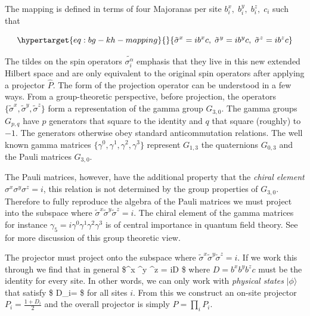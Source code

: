 The mapping is defined in terms of four Majoranas per site \(b_i^x,\;b_i^y,\;b_i^z,\;c_i\) such that

\begin{equation}\protect\hypertarget{eq:bg-kh-mapping}{}{\tilde{\sigma}^x = i b^x c,\; \tilde{\sigma}^y = i b^y c,\; \tilde{\sigma}^z = i b^z c}\label{eq:bg-kh-mapping}\end{equation}

The tildes on the spin operators \(\tilde{\sigma_i^\alpha}\) emphasis that they live in this new extended Hilbert space and are only equivalent to the original spin operators after applying a projector \(\hat{P}\). The form of the projection operator can be understood in a few ways. From a group-theoretic perspective, before projection, the operators \(\{\tilde{\sigma}^x, \tilde{\sigma}^y, \tilde{\sigma}^z\}\) form a representation of the gamma group \(G_{3,0}\). The gamma groups \(G_{p,q}\) have \(p\) generators that square to the identity and \(q\) that square (roughly) to \(-1\). The generators otherwise obey standard anticommutation relations. The well known gamma matrices \(\{\gamma^0, \gamma^1, \gamma^2, \gamma^3\}\) represent \(G_{1,3}\) the quaternions \(G_{0,3}\) and the Pauli matrices \(G_{3,0}\).

The Pauli matrices, however, have the additional property that the \emph{chiral element} \(\sigma^x \sigma^y \sigma^z = i\), this relation is not determined by the group properties of \(G_{3,0}\). Therefore to fully reproduce the algebra of the Pauli matrices we must project into the subspace where \(\tilde{\sigma}^x \tilde{\sigma}^y \tilde{\sigma}^z = i\). The chiral element of the gamma matrices for instance \(\gamma_5 = i\gamma^0 \gamma^1 \gamma^2 \gamma^3\) is of central importance in quantum field theory. See~\autocite{petitjeanChiralityDiracSpinors2020} for more discussion of this group theoretic view.

The projector must project onto the subspace where \(\tilde \sigma^x \tilde \sigma^y \tilde \sigma^z = i\). If we work this through we find that in general \$\tilde \sigma\^{}x \tilde \sigma\^{}y \tilde\sigma\^{}z = iD \$ where \(D = b^x b^y b^z c\) must be the identity for every site. In other words, we can only work with \emph{physical states} \(|\phi\rangle\) that satisfy \$ D\_i\textbar{}\phi\rangle = \textbar{}\phi\rangle\$ for all sites \(i\). From this we construct an on-site projector \(P_i = \frac{1 + D_i}{2}\) and the overall projector is simply \(P = \prod_i P_i\).

